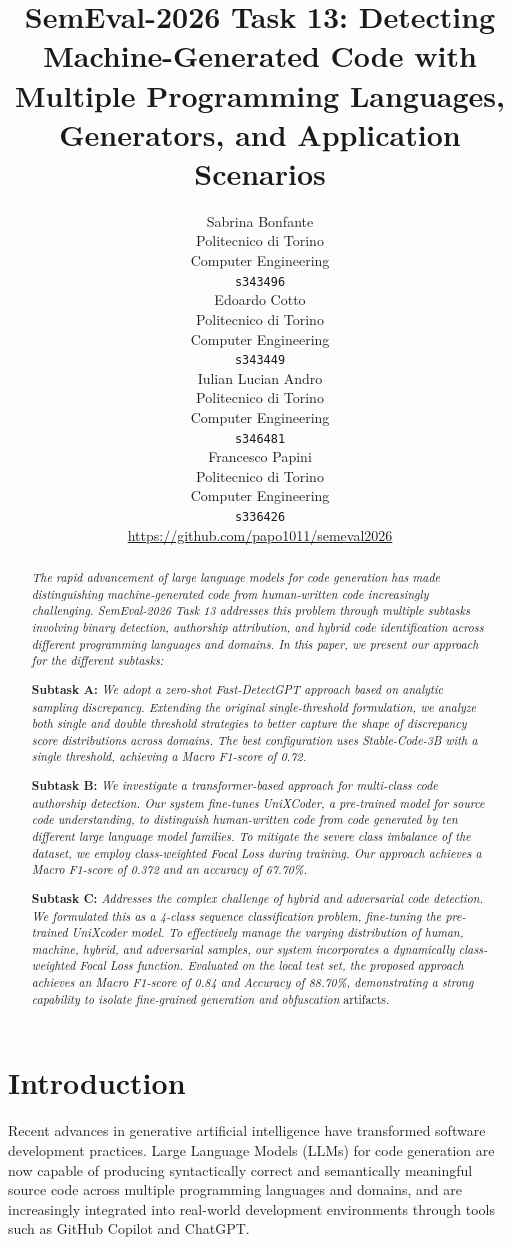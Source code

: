 \documentclass[11pt]{article}
\title{SemEval-2026 Task 13: Detecting Machine-Generated Code with Multiple Programming Languages, Generators, and Application Scenarios}
\author{Sabrina Bonfante \\
  Politecnico di Torino \\
  Computer Engineering \\
  \texttt{s343496} \\\And
  Edoardo Cotto \\
  Politecnico di Torino \\
  Computer Engineering \\
  \texttt{s343449} \\\And
  Iulian Lucian Andro \\
  Politecnico di Torino \\
  Computer Engineering \\
  \texttt{s346481}\\\And
  Francesco Papini\\
  Politecnico di Torino \\
  Computer Engineering \\
\texttt{s336426}\\\AND
  \text{GitHub repository:} \url{https://github.com/papo1011/semeval2026}}
\begin{document}
\maketitle

\begin{abstract}
  \textit{The rapid advancement of large language models for code generation has made distinguishing machine-generated code from human-written code increasingly challenging. SemEval-2026 Task 13 addresses this problem through multiple subtasks involving binary detection, authorship attribution, and hybrid code identification across different programming languages and domains.
  In this paper, we present our approach for the different subtasks:}

  \textbf{Subtask A:} \textit{We adopt a zero-shot Fast-DetectGPT approach based on analytic sampling discrepancy. Extending the original single-threshold formulation, we analyze both single and double threshold strategies to better capture the shape of discrepancy score distributions across domains. The best configuration uses Stable-Code-3B with a single threshold, achieving a Macro F1-score of 0.72.}

  \textbf{Subtask B:}\textit{ We investigate a transformer-based approach for multi-class code authorship detection. Our system fine-tunes UniXCoder, a pre-trained model for source code understanding, to distinguish human-written code from code generated by ten different large language model families. To mitigate the severe class imbalance of the dataset, we employ class-weighted Focal Loss during training. Our approach achieves a Macro F1-score of 0.372 and an accuracy of 67.70\%.}

  \textbf{Subtask C:} \textit{ Addresses the complex challenge of hybrid and adversarial code detection. We formulated this as a 4-class sequence classification problem, fine-tuning the pre-trained UniXcoder model. To effectively manage the varying distribution of human, machine, hybrid, and adversarial samples, our system incorporates a dynamically class-weighted Focal Loss function. Evaluated on the local test set, the proposed approach achieves an Macro F1-score of 0.84 and  Accuracy of 88.70\%, demonstrating a strong capability to isolate fine-grained generation and obfuscation }artifacts.
\end{abstract}

\section{Introduction}
Recent advances in generative artificial intelligence have transformed software development practices. Large Language Models (LLMs) for code generation are now capable of producing  syntactically correct and semantically meaningful source code across multiple programming languages and domains, and are increasingly integrated into real-world development environments through tools such as GitHub Copilot and ChatGPT.
\end{document}
